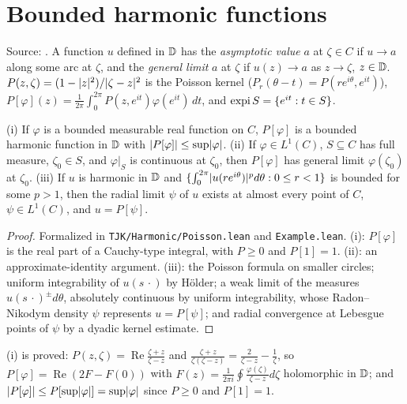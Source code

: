 \section{Bounded harmonic functions}\label{sec:harmonic}
Source: \cite{TAMSa}. A function $u$ defined in $\mathbb{D}$ has the \emph{asymptotic value} $a$ at $\zeta\in C$ if $u\to a$ along some arc
at $\zeta$, and the \emph{general limit} $a$ at $\zeta$ if $u(z)\to a$ as $z\to\zeta$, $z\in\mathbb{D}$. $P(z,\zeta)=(1-\lvert z\rvert^2)/\lvert \zeta-z\rvert^2$
is the Poisson kernel ($P_r(\theta-t)=P(re^{i\theta},e^{it})$), $P[\varphi](z)=\frac1{2\pi}\int_0^{2\pi}P(z,e^{it})\varphi(e^{it})\,dt$, and
$\operatorname{expi} S=\{e^{it}:t\in S\}$.

\begin{theorem}\label{fact:poisson}
(i) If $\varphi$ is a bounded measurable real function on $C$, $P[\varphi]$ is a bounded harmonic function in $\mathbb{D}$ with
$\lvert P[\varphi]\rvert\le\sup\lvert \varphi\rvert$.
(ii) If $\varphi\in L^1(C)$, $S\subseteq C$ has full measure, $\zeta_0\in S$, and $\varphi|_S$ is continuous at $\zeta_0$, then
$P[\varphi]$ has general limit $\varphi(\zeta_0)$ at $\zeta_0$.
(iii) If $u$ is harmonic in $\mathbb{D}$ and $\{\int_{0}^{2\pi}\lvert u(re^{i\theta})\rvert^pd\theta:0\le r<1\}$ is bounded for some $p>1$, then the
radial limit $\psi$ of $u$ exists at almost every point of $C$, $\psi\in L^1(C)$, and $u=P[\psi]$.
\end{theorem}
\begin{proof}Formalized in \texttt{TJK/Harmonic/Poisson.lean} and \texttt{Example.lean}. (i): $P[\varphi]$ is the real part of a Cauchy-type integral, with $P\ge0$ and $P[1]=1$. (ii): an approximate-identity argument. (iii): the Poisson formula on smaller circles; uniform integrability of $u(s\,\cdot)$ by H\"older; a weak limit of the measures $u(s\,\cdot)^{\pm}d\theta$, absolutely continuous by uniform integrability, whose Radon--Nikodym density $\psi$ represents $u=P[\psi]$; and radial convergence at Lebesgue points of $\psi$ by a dyadic kernel estimate.\end{proof}
\noindent (i) is proved: $P(z,\zeta)=\operatorname{Re}\frac{\zeta+z}{\zeta-z}$ and $\frac{\zeta+z}{\zeta(\zeta-z)}=\frac2{\zeta-z}-\frac1\zeta$, so
$P[\varphi]=\operatorname{Re}(2F-F(0))$ with $F(z)=\frac1{2\pi i}\oint\frac{\varphi(\zeta)}{\zeta-z}d\zeta$ holomorphic in $\mathbb{D}$; and
$\lvert P[\varphi]\rvert\le P[\sup\lvert \varphi\rvert]=\sup\lvert \varphi\rvert$ since $P\ge0$ and $P[1]=1$.

